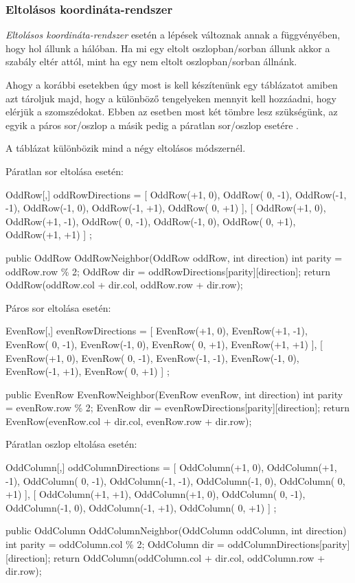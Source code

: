 \subsubsection{Eltolásos koordináta-rendszer}

\textit{Eltolásos koordináta-rendszer} esetén a lépések változnak annak a függvényében, hogy hol állunk a hálóban. Ha mi egy eltolt oszlopban/sorban állunk akkor a szabály eltér attól, mint ha egy nem eltolt oszlopban/sorban állnánk.

Ahogy a korábbi esetekben úgy most is kell készítenünk egy táblázatot amiben azt tároljuk majd, hogy a különböző tengelyeken mennyit kell hozzáadni, hogy elérjük a szomszédokat. Ebben az esetben most két tömbre lesz szükségünk, az egyik a páros sor/oszlop a másik pedig a páratlan sor/oszlop esetére \cite{redblobgamesHexagonalGrids}.

A táblázat különbözik mind a négy eltolásos módszernél.

\bigskip

Páratlan sor eltolása esetén:
\begin{cpp}
OddRow[,] oddRowDirections = 
{ 
   [ 
      OddRow(+1,  0), OddRow( 0, -1), OddRow(-1, -1),
      OddRow(-1,  0), OddRow(-1, +1), OddRow( 0, +1) 
   ],
   [ 
      OddRow(+1,  0), OddRow(+1, -1), OddRow( 0, -1),
      OddRow(-1,  0), OddRow( 0, +1), OddRow(+1, +1) 
   ]
};

public OddRow OddRowNeighbor(OddRow oddRow, int direction)
{
   int parity = oddRow.row \% 2;
   OddRow dir = oddRowDirections[parity][direction];
   return OddRow(oddRow.col + dir.col, oddRow.row + dir.row);
}   
\end{cpp}

Páros sor eltolása esetén:
\begin{cpp}  
EvenRow[,] evenRowDirections = 
{ 
   [
      EvenRow(+1,  0), EvenRow(+1, -1), EvenRow( 0, -1),
      EvenRow(-1,  0), EvenRow( 0, +1), EvenRow(+1, +1) 
   ],
   [ 
      EvenRow(+1,  0), EvenRow( 0, -1), EvenRow(-1, -1),
      EvenRow(-1,  0), EvenRow(-1, +1), EvenRow( 0, +1) 
   ]
};

public EvenRow EvenRowNeighbor(EvenRow evenRow, int direction)
{
   int parity = evenRow.row \% 2;
   EvenRow dir = evenRowDirections[parity][direction];
   return EvenRow(evenRow.col + dir.col, evenRow.row + dir.row);
}   
\end{cpp}

Páratlan oszlop eltolása esetén:
\begin{cpp}
OddColumn[,] oddColumnDirections = 
{ 
   [ 
      OddColumn(+1,  0), OddColumn(+1, -1), OddColumn( 0, -1),
      OddColumn(-1, -1), OddColumn(-1,  0), OddColumn( 0, +1) 
   ],
   [ 
      OddColumn(+1, +1), OddColumn(+1,  0), OddColumn( 0, -1),
      OddColumn(-1,  0), OddColumn(-1, +1), OddColumn( 0, +1) 
   ]
};

public OddColumn OddColumnNeighbor(OddColumn oddColumn, int direction)
{
   int parity = oddColumn.col \% 2;
   OddColumn dir = oddColumnDirections[parity][direction];
   return OddColumn(oddColumn.col + dir.col, oddColumn.row + dir.row);
}   
\end{cpp}

